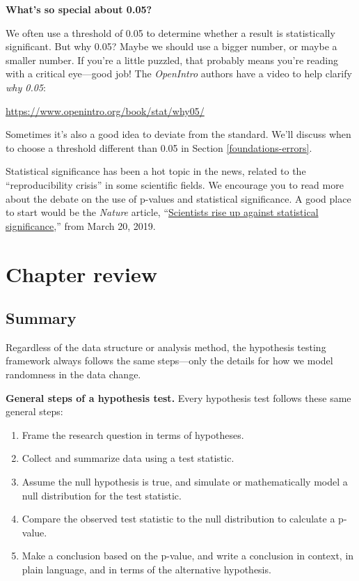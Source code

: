 \documentclass[
  10pt,
  openany]{book}
\providecommand{\tightlist}{%
  \setlength{\itemsep}{0pt}\setlength{\parskip}{0pt}}
\theoremstyle{definition}
\theoremstyle{definition}
\theoremstyle{definition}
\theoremstyle{definition}
\theoremstyle{remark}
\begin{document}
\textbf{What's so special about 0.05?}

We often use a threshold of 0.05 to determine whether a result is statistically significant. But why 0.05? Maybe we should use a bigger number, or maybe a smaller number. If you're a little puzzled, that probably means you're reading with a critical eye---good job! The \emph{OpenIntro} authors have a video to help clarify \emph{why 0.05}:

\url{https://www.openintro.org/book/stat/why05/}

Sometimes it's also a good idea to deviate from the standard. We'll discuss when to choose a threshold different than 0.05 in Section \ref{foundations-errors}.

Statistical significance has been a hot topic in the news, related to the ``reproducibility crisis'' in some scientific fields. We encourage you to read more about the debate on the use of p-values and statistical significance. A good place to start would be the \emph{Nature} article, ``\href{https://www.nature.com/articles/d41586-019-00857-9}{Scientists rise up against statistical significance},'' from March 20, 2019.

\section{Chapter review}\label{chp9-review}

\subsection*{Summary}\label{summary-6}

Regardless of the data structure or analysis method, the hypothesis testing framework always follows the same steps---only the details for how we model randomness in the data change.

\textbf{General steps of a hypothesis test.} Every hypothesis test follows these same general steps:

\begin{enumerate}
\def\labelenumi{\arabic{enumi}.}
\tightlist
\item
  Frame the research question in terms of hypotheses.
\item
  Collect and summarize data using a test statistic.
\item
  Assume the null hypothesis is true, and simulate or mathematically model a null distribution for the test statistic.
\item
  Compare the observed test statistic to the null distribution to calculate a p-value.
\item
  Make a conclusion based on the p-value, and write a conclusion in context, in plain language, and in terms of the alternative hypothesis.
\end{enumerate}
\end{document}
